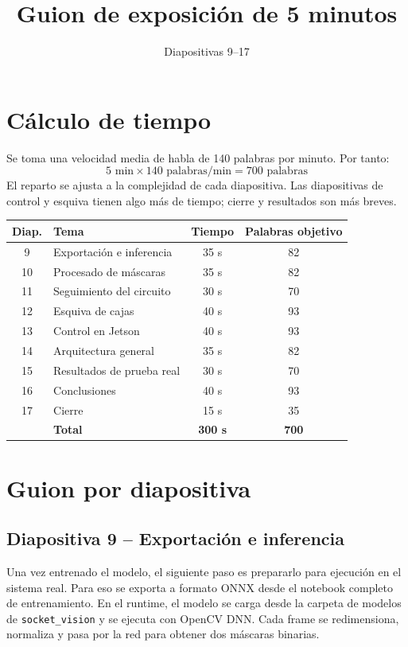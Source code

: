 \documentclass[a4paper,11pt]{article}
\title{Guion de exposici\'on de 5 minutos}
\author{Diapositivas 9--17}
\date{}
\begin{document}
\maketitle

\section*{C\'alculo de tiempo}
Se toma una velocidad media de habla de 140 palabras por minuto. Por tanto:
\[
5 \text{ min} \times 140 \text{ palabras/min} = 700 \text{ palabras}
\]
El reparto se ajusta a la complejidad de cada diapositiva. Las diapositivas de control y esquiva tienen algo m\'as de tiempo; cierre y resultados son m\'as breves.

\begin{center}
\centering
\begin{tabular}{@{}clcc@{}}
\toprule
\textbf{Diap.} & \textbf{Tema} & \textbf{Tiempo} & \textbf{Palabras objetivo} \\
\midrule
9  & Exportaci\'on e inferencia & 35 s & 82 \\
10 & Procesado de m\'ascaras & 35 s & 82 \\
11 & Seguimiento del circuito & 30 s & 70 \\
12 & Esquiva de cajas & 40 s & 93 \\
13 & Control en Jetson & 40 s & 93 \\
14 & Arquitectura general & 35 s & 82 \\
15 & Resultados de prueba real & 30 s & 70 \\
16 & Conclusiones & 40 s & 93 \\
17 & Cierre & 15 s & 35 \\
\midrule
 & \textbf{Total} & \textbf{300 s} & \textbf{700} \\
\bottomrule
\end{tabular}
\end{center}

\section*{Guion por diapositiva}

\subsection*{Diapositiva 9 -- Exportaci\'on e inferencia}
Una vez entrenado el modelo, el siguiente paso es prepararlo para ejecuci\'on en el sistema real. Para eso se exporta a formato ONNX desde el notebook completo de entrenamiento. En el runtime, el modelo se carga desde la carpeta de modelos de \texttt{socket\_vision} y se ejecuta con OpenCV DNN. Cada frame se redimensiona, normaliza y pasa por la red para obtener dos m\'ascaras binarias.
\end{document}
